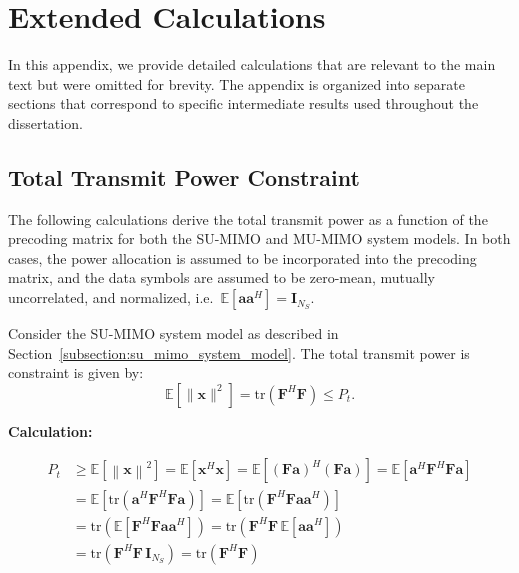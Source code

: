 \chapter{Extended Calculations}
\label{appendix:calculations}

In this appendix, we provide detailed calculations that are relevant to the main text but were omitted for brevity.
The appendix is organized into separate sections that correspond to specific intermediate results used throughout the dissertation.

\section*{Total Transmit Power Constraint}
\label{calculation:transmit_power_constraint}

The following calculations derive the total transmit power as a function of the precoding matrix for both the \ac{SU}-\ac{MIMO} and \ac{MU}-\ac{MIMO} system models.
In both cases, the power allocation is assumed to be incorporated into the precoding matrix, and the data symbols are assumed to be zero-mean, mutually uncorrelated, and normalized, i.e.\ $\mathbb{E}\!\left[\mathbf{a}\mathbf{a}^H\right] = \mathbf{I}_{N_S}$.

Consider the \ac{SU}-\ac{MIMO} system model as described in Section~\ref{subsection:su_mimo_system_model}.
The total transmit power is constraint is given by:
\begin{equation*}
    \mathbb{E}\!\left[\|\mathbf{x}\|^2\right] = \mathrm{tr}\!\left(\mathbf{F}^H \mathbf{F}\right) \leq P_t.
\end{equation*}

\textbf{Calculation:}
\begin{fleqn}[2.5em]
\begin{subequations}
\begin{align*}
    P_t
    &\geq \mathbb{E}\!\left[ \left\|\mathbf{x}\right\|^2 \right]
    = \mathbb{E}\!\left[ \mathbf{x}^H \mathbf{x} \right]
    = \mathbb{E}\!\left[ \left(\mathbf{F} \mathbf{a}\right)^H \left(\mathbf{F} \mathbf{a}\right) \right]
    = \mathbb{E}\!\left[ \mathbf{a}^H \mathbf{F}^H \mathbf{F} \mathbf{a} \right] \\
    &= \mathbb{E}\!\left[ \mathrm{tr}\!\left( \mathbf{a}^H \mathbf{F}^H \mathbf{F} \mathbf{a} \right) \right]
    = \mathbb{E}\!\left[ \mathrm{tr}\!\left( \mathbf{F}^H \mathbf{F} \mathbf{a} \mathbf{a}^H \right) \right] \\
    &= \mathrm{tr}\!\left( \mathbb{E}\!\left[ \mathbf{F}^H \mathbf{F} \mathbf{a} \mathbf{a}^H \right] \right)
    = \mathrm{tr}\!\left( \mathbf{F}^H \mathbf{F} \, \mathbb{E}\!\left[ \mathbf{a} \mathbf{a}^H \right] \right) \\
    &= \mathrm{tr}\!\left( \mathbf{F}^H \mathbf{F} \, \mathbf{I}_{N_S} \right)
    = \mathrm{tr}\!\left( \mathbf{F}^H \mathbf{F} \right)
\end{align*}
\end{subequations}
\end{fleqn}

